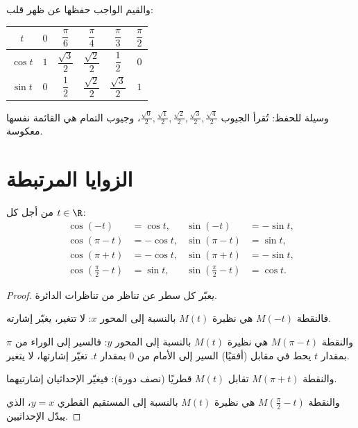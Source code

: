 والقيم الواجب حفظها عن ظهر قلب:
\begin{center}
\begin{tabular}{c|ccccc}
$t$ & $0$ & $\dfrac{\pi}{6}$ & $\dfrac{\pi}{4}$ & $\dfrac{\pi}{3}$ & $\dfrac{\pi}{2}$\\[6pt]
\hline\rule{0pt}{14pt}%
$\cos t$ & $1$ & $\dfrac{\sqrt3}{2}$ & $\dfrac{\sqrt2}{2}$ & $\dfrac12$ & $0$\\[6pt]
$\sin t$ & $0$ & $\dfrac12$ & $\dfrac{\sqrt2}{2}$ & $\dfrac{\sqrt3}{2}$ & $1$
\end{tabular}
\end{center}

\begin{remark}
وسيلة للحفظ: تُقرأ الجيوب
$\frac{\sqrt0}{2}, \frac{\sqrt1}{2}, \frac{\sqrt2}{2}, \frac{\sqrt3}{2},
\frac{\sqrt4}{2}$، وجيوب التمام هي القائمة نفسها معكوسة.
\end{remark}

\section{الزوايا المرتبطة}

\begin{proposition}\label{prop:g11:trigo:associated}
من أجل كل $t \in \R$:
\[
\begin{aligned}
\cos(-t) &= \cos t, & \sin(-t) &= -\sin t,\\
\cos(\pi - t) &= -\cos t, & \sin(\pi - t) &= \sin t,\\
\cos(\pi + t) &= -\cos t, & \sin(\pi + t) &= -\sin t,\\
\cos\left(\tfrac{\pi}{2} - t\right) &= \sin t, &
\sin\left(\tfrac{\pi}{2} - t\right) &= \cos t .
\end{aligned}
\]
\end{proposition}

\begin{proof}
يعبّر كل سطر عن تناظر من تناظرات الدائرة.

فالنقطة $M(-t)$ هي نظيرة $M(t)$ بالنسبة إلى المحور $x$: 
لا تتغير،  يغيّر إشارته.

والنقطة $M(\pi - t)$ هي نظيرة $M(t)$ بالنسبة إلى المحور $y$: فالسير
إلى الوراء من $\pi$ بمقدار $t$ يحط في مقابل (أفقيًا) السير
إلى الأمام من $0$ بمقدار $t$.  تغيّر إشارتها، 
لا يتغير.

والنقطة $M(\pi + t)$ تقابل $M(t)$ قطريًا (نصف دورة): فيغيّر
الإحداثيان إشارتيهما.

والنقطة $M\!\left(\frac\pi2 - t\right)$ هي نظيرة $M(t)$ بالنسبة إلى
المستقيم القطري $y = x$، الذي يبدّل الإحداثيين.
\end{proof}

